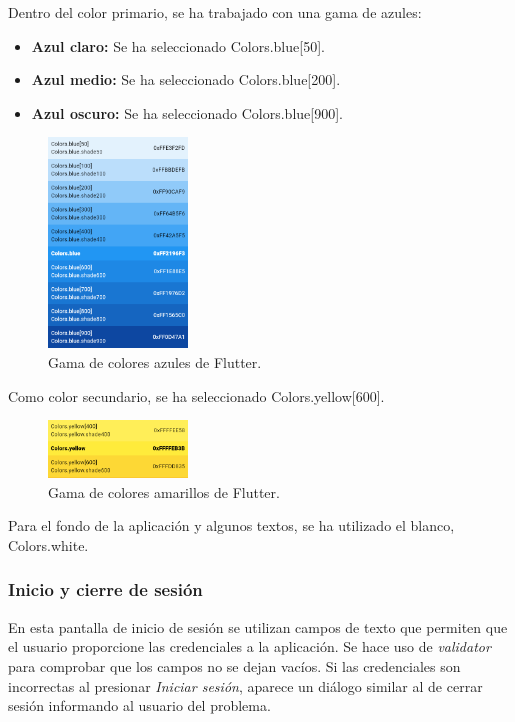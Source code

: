 Dentro del color primario, se ha trabajado con una gama de azules: 
\begin{itemize}
	\item \textbf{Azul claro:} Se ha seleccionado Colors.blue[50]. 
	\item \textbf{Azul medio:} Se ha seleccionado Colors.blue[200]. 
	\item \textbf{Azul oscuro:} Se ha seleccionado Colors.blue[900]. 
\end{itemize}

\begin{figure}[H]
	\centering
	\includegraphics[width=0.33\textwidth]{imagenes/TerceraIteracion/ColorsBlue.png}
	\caption{Gama de colores azules de Flutter.}
\end{figure}


Como color secundario, se ha seleccionado Colors.yellow[600]. 

\begin{figure}[H]
	\centering
	\includegraphics[width=0.33\textwidth]{imagenes/TerceraIteracion/ColorsYellow.png}
	\caption{Gama de colores amarillos de Flutter.}
\end{figure}

Para el fondo de la aplicación y algunos textos, se ha utilizado el blanco, Colors.white. 

\newpage

\subsubsection{Inicio y cierre de sesión}


En esta pantalla de inicio de sesión se utilizan campos de texto que permiten que el usuario proporcione las credenciales a la aplicación. Se hace uso de \textit{validator} para comprobar que los campos no se dejan vacíos. Si las credenciales son incorrectas al presionar \textit{Iniciar sesión}, aparece un diálogo similar al de cerrar sesión informando al usuario del problema. 


